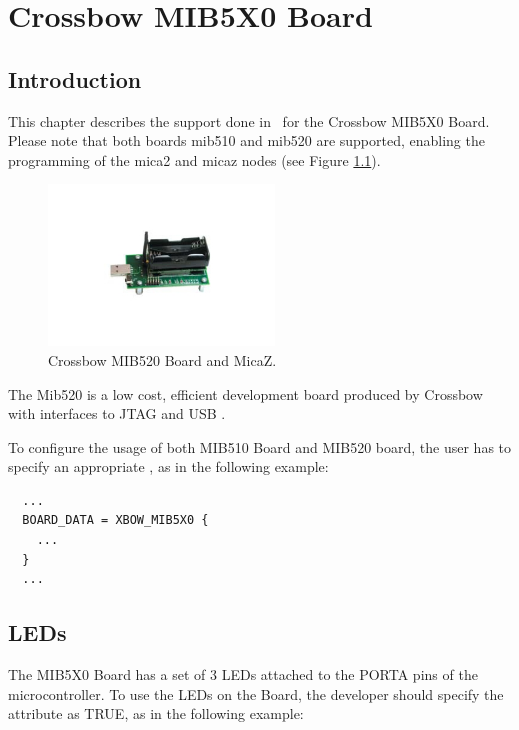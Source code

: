 \chapter[Crossbow MIB5X0 Board]{Crossbow MIB5X0 Board}

\section{Introduction}

This chapter describes the support done in \ee\ for the Crossbow
MIB5X0 Board. Please note that both boards mib510 and mib520 are
supported, enabling the programming of the mica2 and micaz nodes (see
Figure \ref{fig:mib520}).

\begin{figure}
  \begin{center}
    \includegraphics[width=6cm, bb=0 0 420 300]{images/mibmicaz.jpg}
  \end{center}
  \caption{Crossbow MIB520 Board and MicaZ.}
  \label{fig:mib520}
\end{figure}

The Mib520 is a low cost, efficient development board produced by
Crossbow with interfaces to JTAG and USB \cite{mibmicaz}.

To configure the usage of both MIB510 Board and MIB520 board, the user
has to specify an appropriate , as in the following example:

\begin{lstlisting}
  ...
  BOARD_DATA = XBOW_MIB5X0 {
    ...
  }
  ...
\end{lstlisting}


\section{LEDs}

The MIB5X0 Board has a set of 3 LEDs attached to the PORTA pins of the
microcontroller. To use the LEDs on the Board, the
developer should specify the  attribute as TRUE, as in
the following example:

